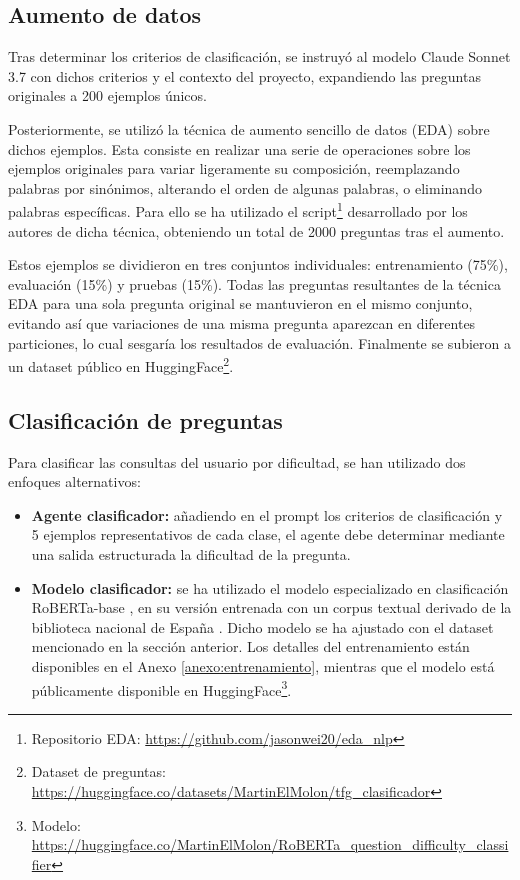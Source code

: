 \subsection{Aumento de datos}
Tras determinar los criterios de clasificación, se instruyó al modelo Claude Sonnet 3.7 con dichos criterios y el contexto del proyecto, expandiendo las preguntas originales a 200 ejemplos únicos.

Posteriormente, se utilizó la técnica de aumento sencillo de datos (EDA) \cite{wei_eda_2019} sobre dichos ejemplos. Esta consiste en realizar una serie de operaciones sobre los ejemplos originales para variar ligeramente su composición, reemplazando palabras por sinónimos, alterando el orden de algunas palabras, o eliminando palabras específicas. Para ello se ha utilizado el script\footnote{Repositorio EDA: \url{https://github.com/jasonwei20/eda_nlp}} desarrollado por los autores de dicha técnica, obteniendo un total de 2000 preguntas tras el aumento.

Estos ejemplos se dividieron en tres conjuntos individuales: entrenamiento (75\%), evaluación (15\%) y pruebas (15\%). Todas las preguntas resultantes de la técnica EDA para una sola pregunta original se mantuvieron en el mismo conjunto, evitando así que variaciones de una misma pregunta aparezcan en diferentes particiones, lo cual sesgaría los resultados de evaluación. Finalmente se subieron a un dataset público en HuggingFace\footnote{Dataset de preguntas: \url{https://huggingface.co/datasets/MartinElMolon/tfg_clasificador}}.

\subsection{Clasificación de preguntas}
Para clasificar las consultas del usuario por dificultad, se han utilizado dos enfoques alternativos:

\begin{itemize}
\item\textbf{Agente clasificador: }añadiendo en el prompt los criterios de clasificación y 5 ejemplos representativos de cada clase, el agente debe determinar mediante una salida estructurada la dificultad de la pregunta.
\item\textbf{Modelo clasificador: }se ha utilizado el modelo especializado en clasificación RoBERTa-base \cite{liu_roberta_2019}, en su versión entrenada con un corpus textual derivado de la biblioteca nacional de España \cite{gutierrez-fandino_maria_2021}. Dicho modelo se ha ajustado con el dataset mencionado en la sección anterior. Los detalles del entrenamiento están disponibles en el Anexo \ref{anexo:entrenamiento}, mientras que el modelo está públicamente disponible en HuggingFace\footnote{Modelo: \url{https://huggingface.co/MartinElMolon/RoBERTa_question_difficulty_classifier}}.


\end{itemize}
